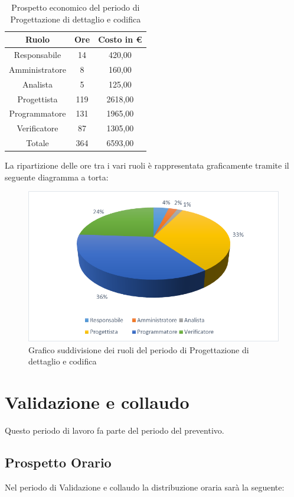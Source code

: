 \documentclass[./PianodiProgetto.tex]{subfiles}
\begin{document}
\begin{table}[H]
	\centering
	\begin{tabular}{|c|c|c|}
		\hline
		Ruolo&Ore&Costo in \euro{} \\ \hline
		Responsabile&14&420,00  \\ \hline
		Amministratore&8&160,00  \\ \hline
		Analista&5&125,00 \\ \hline
		Progettista&119&2618,00  \\ \hline
		Programmatore&131&1965,00  \\ \hline
		Verificatore&87&1305,00  \\ \hline
		Totale&364&6593,00 \\ \hline
	\end{tabular}
	\caption{Prospetto economico del periodo di Progettazione di dettaglio e codifica}
\end{table}

La ripartizione delle ore tra i vari ruoli è rappresentata graficamente tramite il seguente diagramma a torta:

\begin{figure}[H]
	\centering
	\includegraphics[width=1\linewidth]{img/grafici/ProgettazioneDettaglioCodificaProspettoEconomico}
	\caption{Grafico suddivisione dei ruoli del periodo di Progettazione di dettaglio e codifica}
	\label{fig:progettazione-dettaglio-codifica-prospetto-economico}
\end{figure}

\section{Validazione e collaudo}
Questo periodo di lavoro fa parte del periodo del preventivo.
\subsection{Prospetto Orario}
Nel periodo di Validazione e collaudo la distribuzione oraria sarà la seguente:
\end{document}
